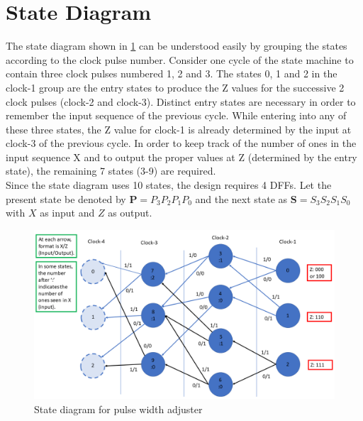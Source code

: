 \documentclass[journal,10pt,twocolumn]{article}
\begin{document}
\section*{\large State Diagram}
The state diagram shown in \ref{fig:state_diagram} can be understood easily by grouping the states according to the clock pulse number. Consider one cycle of the state machine to contain three clock pulses numbered 1, 2 and 3. The states 0, 1 and 2 in the clock-1 group are the entry states to produce the Z values for the successive 2 clock pulses (clock-2 and clock-3). Distinct entry states are necessary in order to remember the input sequence of the previous cycle. While entering into any of these three states, the Z value for clock-1 is already determined by the input at clock-3 of the previous cycle. In order to keep track of the number of ones in the input sequence X and to output the proper values at Z (determined by the entry state), the remaining 7 states (3-9) are required.\\
Since the state diagram uses 10 states, the design requires 4 DFFs. Let the present state be denoted by $\textbf{P} = P_3P_2P_1P_0$ and the next state as $\textbf{S} = S_3S_2S_1S_0$ with $X$ as input and $Z$ as output.
\begin{figure}[ht]
\centering
\includegraphics[width=1\columnwidth]{state_diagram.png}
\caption{State diagram for pulse width adjuster}
\label{fig:state_diagram}
\end{figure}
\end{document}
